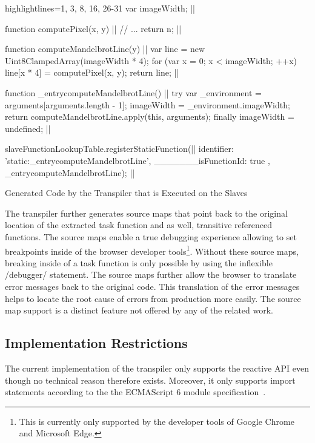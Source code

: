 \begin{listing}
\begin{javascriptcode*}{highlightlines={1, 3, 8, 16, 26-31}}
var imageWidth; |$\label{code:slave-image-width}$|

function computePixel(x, y) { |$\label{code:slave-compute-pixel-start}$|
	// ...
	return n;
}|$\label{code:slave-compute-pixel-end}$|

function computeMandelbrotLine(y) { |$\label{code:slave-task function-start}$|
	var line = new Uint8ClampedArray(imageWidth * 4);
	for (var x = 0; x < imageWidth; ++x) {
		line[x * 4] = computePixel(x, y);
	}
	return line;
}|$\label{code:slave-task function-end}$|
 
function _entrycomputeMandelbrotLine() { |$\label{code:slave-entry-function-start}$|
	try {
		var _environment = arguments[arguments.length - 1];
		imageWidth = _environment.imageWidth;
		return computeMandelbrotLine.apply(this, arguments);
	} finally {
		imageWidth = undefined;
	}
} |$\label{code:slave-entry-function-end}$|

slaveFunctionLookupTable.registerStaticFunction({|$\label{code:slave-register-function-start}$|
		identifier: 'static:_entrycomputeMandelbrotLine',
		_______isFunctionId: true
	}, _entrycomputeMandelbrotLine); |$\label{code:slave-register-function-end}$|
\end{javascriptcode*}
\caption{Generated Code by the Transpiler that is Executed on the Slaves}
\label{fig:transpiled-mandelbrot-slave}
\end{listing}

The transpiler further generates source maps that point back to the original location of the extracted task function and as well, transitive referenced functions. The source maps enable a true debugging experience allowing to set breakpoints inside of the browser developer tools\footnote{This is currently only supported by the developer tools of Google Chrome and Microsoft Edge.}. Without these source maps, breaking inside of a task function is only possible by using the inflexible \javascriptinline/debugger/ statement. The source maps further allow the browser to translate error messages back to the original code. This translation of the error messages helps to locate the root cause of errors from production more easily. The source map support is a distinct feature not offered by any of the related work.

\subsection{Implementation Restrictions}
The current implementation of the transpiler only supports the reactive API even though no technical reason therefore exists. Moreover, it only supports import statements according to the the ECMAScript 6 module specification~\cite[Section 15.2]{ecmaScript2015}.
